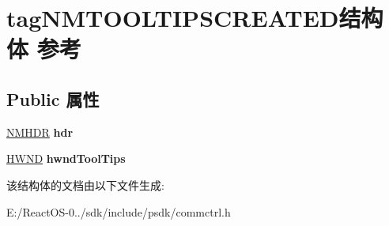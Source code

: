 \hypertarget{structtag_n_m_t_o_o_l_t_i_p_s_c_r_e_a_t_e_d}{}\section{tag\+N\+M\+T\+O\+O\+L\+T\+I\+P\+S\+C\+R\+E\+A\+T\+E\+D结构体 参考}
\label{structtag_n_m_t_o_o_l_t_i_p_s_c_r_e_a_t_e_d}
\subsection*{Public 属性}
\begin{DoxyCompactItemize}
\item 
\mbox{\label{structtag_n_m_t_o_o_l_t_i_p_s_c_r_e_a_t_e_d_a8b3e3405c5d4257483e4afde677a1911}} 
\hyperlink{structtag_n_m_h_d_r}{N\+M\+H\+DR} {\bfseries hdr}
\item 
\mbox{\label{structtag_n_m_t_o_o_l_t_i_p_s_c_r_e_a_t_e_d_a8ef2ae5b4c708e8aca39ffb562c71411}} 
\hyperlink{interfacevoid}{H\+W\+ND} {\bfseries hwnd\+Tool\+Tips}
\end{DoxyCompactItemize}


该结构体的文档由以下文件生成\+:\begin{DoxyCompactItemize}
\item 
E\+:/\+React\+O\+S-\/0../sdk/include/psdk/commctrl.\+h\end{DoxyCompactItemize}

